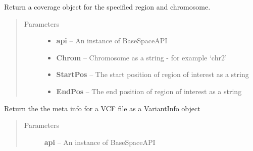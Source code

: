 \documentclass[letterpaper,10pt,english]{sphinxmanual}
\begin{document}
\begin{fulllineitems}
\begin{fulllineitems}
\begin{quote}
\begin{description}
\end{description}\end{quote}

\end{fulllineitems}


\begin{fulllineitems}
\label{Available modules:BaseSpacePy.model.File.File.getIntervalCoverage}
Return a coverage object for the specified region and chromosome.
\begin{quote}\begin{description}
\item[{Parameters}] \leavevmode\begin{itemize}
\item {} 
\textbf{api} -- An instance of BaseSpaceAPI

\item {} 
\textbf{Chrom} -- Chromosome as a string - for example `chr2'

\item {} 
\textbf{StartPos} -- The start position of region of interest as a string

\item {} 
\textbf{EndPos} -- The end position of region of interest as a string

\end{itemize}

\end{description}\end{quote}

\end{fulllineitems}


\begin{fulllineitems}
\label{Available modules:BaseSpacePy.model.File.File.getVariantMeta}
Return the the meta info for a VCF file as a VariantInfo object
\begin{quote}\begin{description}
\item[{Parameters}] \leavevmode
\textbf{api} -- An instance of BaseSpaceAPI

\end{description}\end{quote}


\end{fulllineitems}
\end{fulllineitems}
\end{document}
